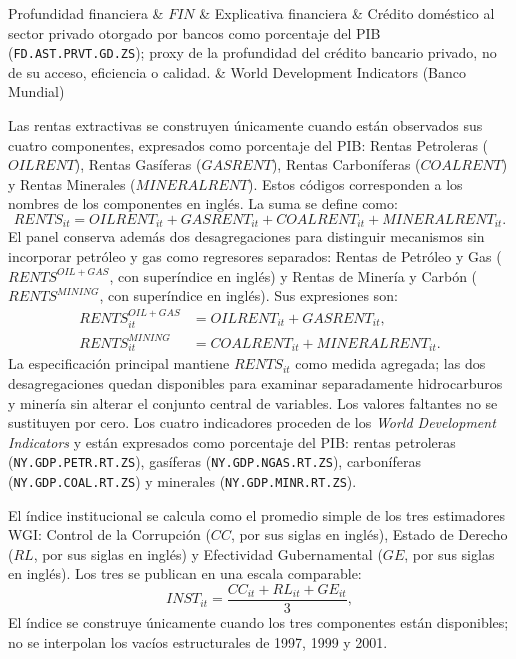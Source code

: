 \documentclass[../../TFM.tex]{subfiles}
\begin{document}
\begin{longtable}
		Profundidad financiera
		& $FIN$
		& Explicativa financiera
		& Crédito doméstico al sector privado otorgado por bancos como porcentaje del PIB (\texttt{FD.AST.PRVT.GD.ZS}); proxy de la profundidad del crédito bancario privado, no de su acceso, eficiencia o calidad.
		& World Development Indicators (Banco Mundial) \\
		\hline

	\end{longtable}
	\normalsize

	Las rentas extractivas se construyen únicamente cuando están observados sus
	cuatro componentes, expresados como porcentaje del PIB: Rentas Petroleras
	($OILRENT$), Rentas Gasíferas ($GASRENT$), Rentas Carboníferas ($COALRENT$)
	y Rentas Minerales ($MINERALRENT$). Estos códigos corresponden a los nombres
	de los componentes en inglés. La suma se define como:
	\[
		RENTS_{it}
		=
		OILRENT_{it}
		+
		GASRENT_{it}
		+
		COALRENT_{it}
		+
		MINERALRENT_{it}.
	\]
	El panel conserva además dos desagregaciones para distinguir mecanismos sin
	incorporar petróleo y gas como regresores separados: Rentas de Petróleo y Gas
	($RENTS^{OIL+GAS}$, con superíndice en inglés) y Rentas de Minería y Carbón
	($RENTS^{MINING}$, con superíndice en inglés). Sus expresiones son:
	\[
		\begin{aligned}
			RENTS^{OIL+GAS}_{it} &= OILRENT_{it}+GASRENT_{it}, \\
			RENTS^{MINING}_{it} &= COALRENT_{it}+MINERALRENT_{it}.
		\end{aligned}
	\]
	La especificación principal mantiene $RENTS_{it}$ como medida agregada; las
	dos desagregaciones quedan disponibles para examinar separadamente
	hidrocarburos y minería sin alterar el conjunto central de variables.
	Los valores faltantes no se sustituyen por cero. Los cuatro indicadores
	proceden de los \textit{World Development Indicators} y están expresados
	como porcentaje del PIB: rentas petroleras
	(\texttt{NY.GDP.PETR.RT.ZS}), gasíferas
	(\texttt{NY.GDP.NGAS.RT.ZS}), carboníferas
	(\texttt{NY.GDP.COAL.RT.ZS}) y minerales
	(\texttt{NY.GDP.MINR.RT.ZS}).

	El índice institucional se calcula como el promedio simple de los tres
	estimadores WGI: Control de la Corrupción ($CC$, por sus siglas en inglés),
	Estado de Derecho ($RL$, por sus siglas en inglés) y Efectividad
	Gubernamental ($GE$, por sus siglas en inglés). Los tres se publican en una
	escala comparable:
	\[
		INST_{it}
		=
		\frac{
			CC_{it}
			+
			RL_{it}
			+
			GE_{it}
		}{3},
	\]
	El índice se construye únicamente cuando
	los tres componentes están disponibles; no se interpolan los vacíos
	estructurales de 1997, 1999 y 2001.
\end{document}
